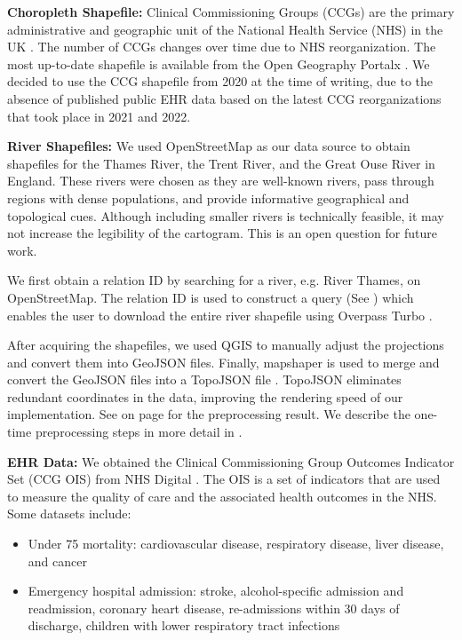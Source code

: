 \documentclass[Afour,sagev,times]{sagej}
\newcommand{\bobgraph}[1]{\noindent\textbf{#1}}
\begin{document}
\bobgraph{Choropleth Shapefile:} Clinical Commissioning Groups (CCGs) are the primary administrative and geographic unit of the National Health Service (NHS) in the UK \cite{nhsNHS}.
The number of CCGs changes over time due to NHS reorganization.
The most up-to-date shapefile is available from the Open Geography Portalx \cite{opengeographyportalxOpen}.
We decided to use the CCG shapefile from 2020 at the time of writing, due to the absence of published public EHR data based on the latest CCG reorganizations that took place in 2021 and 2022.

\bobgraph{River Shapefiles:} We used OpenStreetMap \cite{openstreetmapRelation} as our data source to obtain shapefiles for the Thames River, the Trent River, and the Great Ouse River in England.
These rivers were chosen as they are well-known rivers, pass through regions with dense populations, and provide informative geographical and topological cues.
Although including smaller rivers is technically feasible, it may not increase the legibility of the cartogram.
This is an open question for future work.

We first obtain a relation ID by searching for a river, e.g.
River Thames, on OpenStreetMap.
The relation ID is used to construct a query (See ) which enables the user to download the entire river shapefile using Overpass Turbo \cite{overpassturboOverpass}.

After acquiring the shapefiles, we used QGIS \cite{qgisWelcome} to manually adjust the projections and convert them into GeoJSON files.
Finally, mapshaper \cite{blochMapshaper} is used to merge and convert the GeoJSON files into a TopoJSON file \cite{TopoJSON}.
TopoJSON eliminates redundant coordinates in the data, improving the rendering speed of our implementation.
See  on page \pageref{table:pre-processing_result} for the preprocessing result.
We describe the one-time preprocessing steps in more detail in .

\bobgraph{EHR Data: }We obtained the Clinical Commissioning Group Outcomes Indicator Set (CCG OIS) from NHS Digital \cite{nhsdigitalClinical}.
The OIS is a set of indicators that are used to measure the quality of care and the associated health outcomes in the NHS.
Some datasets include:
\begin{itemize}
    \setlength\itemsep{0px}
    \item Under 75 mortality: cardiovascular disease, respiratory disease, liver disease, and cancer
    \item Emergency hospital admission: stroke, alcohol-specific admission and readmission, coronary heart disease, re-admissions within 30 days of discharge, children with lower respiratory tract infections
\end{itemize}
\end{document}
